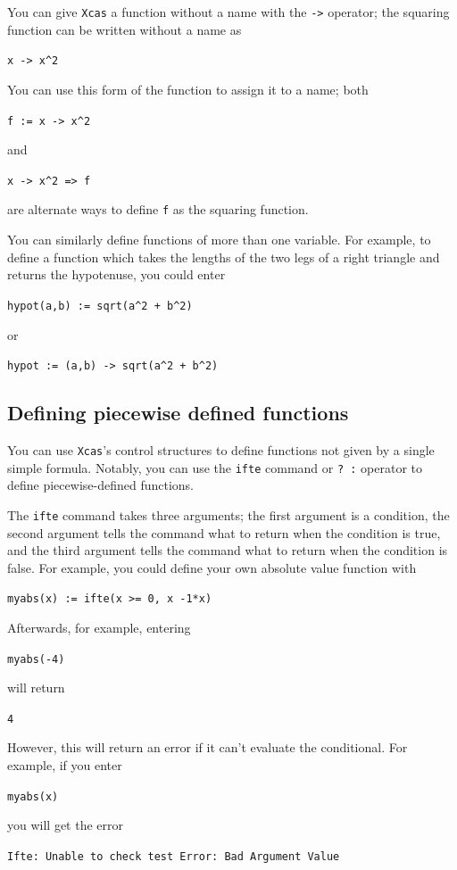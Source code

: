 \documentclass[a4paper,11pt]{book}
\begin{document}
You can give \texttt{Xcas} a function without a name with the
\texttt{->}\index{->} operator; the squaring function can be written
without a name as
\begin{center}
  {\tt x -> x\^{}2}
\end{center}
You can use this form of the function to assign it to a name; both
\begin{center}
  {\tt f := x -> x\^{}2}
\end{center}
and
\begin{center}
  {\tt x -> x\^{}2 => f}
\end{center}
are alternate ways to define \texttt{f} as the squaring function.

You can similarly define functions of more than one variable.  For
example, to define a function which takes the lengths of the two legs
of a right triangle and returns the hypotenuse, you could enter
\begin{center}
  {\tt hypot(a,b) := sqrt(a\^{}2 + b\^{}2)}
\end{center}
or
\begin{center}
  {\tt hypot := (a,b) -> sqrt(a\^{}2 + b\^{}2)}
\end{center}

\subsection{Defining piecewise defined functions}
\label{subsec:piecewise}

You can use \texttt{Xcas}'s control structures to define functions not
given by a single simple formula.  Notably, you can use the
\texttt{ifte} command or \texttt{? :} operator
to define piecewise-defined functions.

The \texttt{ifte} command takes three arguments; the first argument is
a condition, the second argument tells the command what to return when
the condition is true, and the third argument tells the command what
to return when the condition is false.  For example, you could define
your own absolute value function with
\begin{center}
  {\tt myabs(x) := ifte(x >= 0, x -1*x)}
\end{center}
Afterwards, for example, entering
\begin{center}
  {\tt myabs(-4)}
\end{center}
will return
\begin{center}
  {\tt 4}
\end{center}
However, this will return an error if it can't evaluate the
conditional.  For example, if you enter
\begin{center}
  {\tt myabs(x)}
\end{center}
you will get the error
\begin{center}
  {\tt Ifte: Unable to check test Error: Bad Argument Value}
\end{center}
\end{document}
